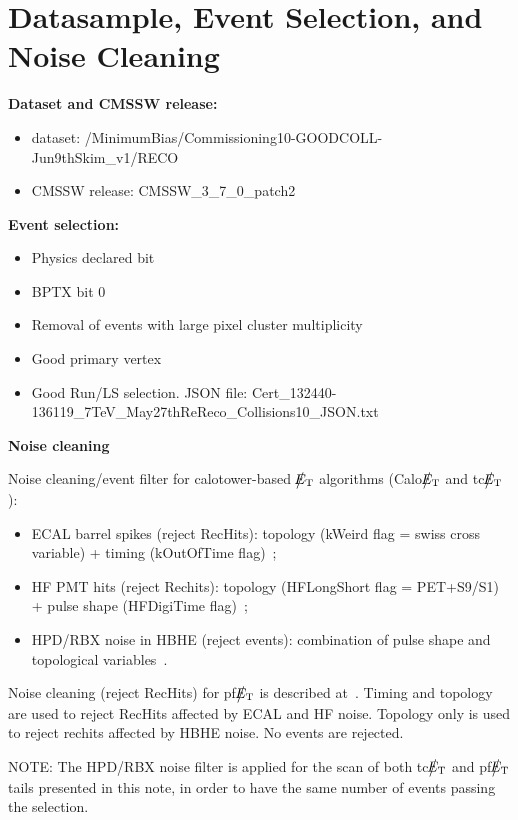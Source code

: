 \section{Datasample, Event Selection, and Noise Cleaning} \label{sec:EventSelection}

{\bf Dataset and CMSSW release:}
\begin{itemize}
\item dataset: /MinimumBias/Commissioning10-GOODCOLL-Jun9thSkim\_v1/RECO
\item CMSSW release: CMSSW\_3\_7\_0\_patch2
\end{itemize}

{\bf Event selection:}
\begin{itemize}
\item Physics declared bit
\item BPTX bit 0
\item Removal of events with large pixel cluster multiplicity
\item Good primary vertex
\item Good Run/LS selection. JSON file: Cert\_132440-136119\_7TeV\_May27thReReco\_Collisions10\_JSON.txt  
\end{itemize}

{\bf Noise cleaning}

Noise cleaning/event filter for calotower-based $\big\slash\hspace{-1.6ex}{E_\text{T}}$ algorithms (Calo$\big\slash\hspace{-1.6ex}{E_\text{T}}$ and tc$\big\slash\hspace{-1.6ex}{E_\text{T}}$):
\begin{itemize}
\item ECAL barrel spikes (reject RecHits): topology (kWeird flag = swiss cross variable) + timing (kOutOfTime flag)~\cite{ECALAt7TeV};
\item HF PMT hits (reject Rechits): topology (HFLongShort flag = PET+S9/S1) + pulse shape (HFDigiTime flag)~\cite{HFDN};
\item HPD/RBX noise in HBHE (reject events): combination of pulse shape and topological variables~\cite{HCALWGNOTE}.
\end{itemize}

Noise cleaning (reject RecHits) for pf$\big\slash\hspace{-1.6ex}{E_\text{T}}$ is described at~\cite{PFPAS2010}. Timing and topology are used to reject RecHits 
affected by ECAL and HF noise. Topology only is used to reject rechits affected by HBHE noise. No events are rejected.

NOTE: The HPD/RBX noise filter is applied for the scan of both tc$\big\slash\hspace{-1.6ex}{E_\text{T}}$ and pf$\big\slash\hspace{-1.6ex}{E_\text{T}}$ tails presented in this note, 
in order to have the same number of events passing the selection.

